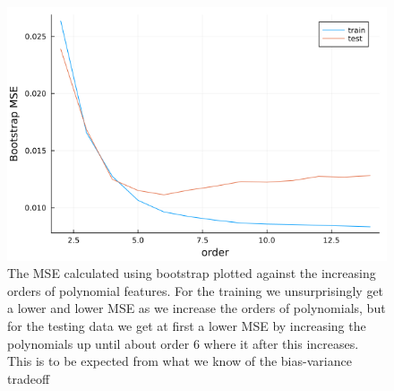 \documentclass{article}
\begin{document}
\begin{figure}
    \includegraphics[scale=0.5]{bootstrapbiasvariance}
    \caption{The MSE calculated using bootstrap plotted against the increasing
        orders of polynomial features. For the training we unsurprisingly get a
        lower and lower MSE as we increase the orders of polynomials, but for the
        testing data we get at first a lower MSE by increasing the polynomials up
        until about order $6$ where it after this increases. This is to be expected
        from what we know of the bias-variance tradeoff}
    \label{bootstrap-bias-var}
\end{figure}
\end{document}
